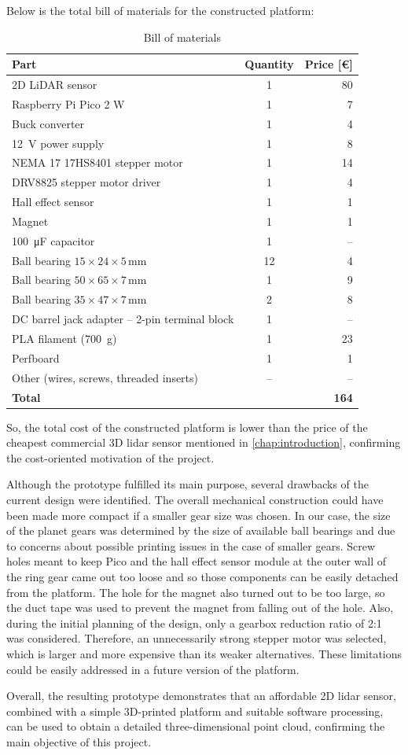 Below is the total bill of materials for the constructed platform:
\begin{table}[H]
    \centering
    \caption{Bill of materials}
    \begin{tabular}{lcr}
        \toprule
        Part & Quantity & Price [\euro] \\
        \midrule
        2D LiDAR sensor & 1 & 80 \\
        Raspberry Pi Pico 2 W & 1 & 7 \\
        Buck converter & 1 & 4 \\
        \SI{12}{V} power supply & 1 & 8 \\
        NEMA 17 17HS8401 stepper motor & 1 & 14 \\
        DRV8825 stepper motor driver & 1 & 4 \\
        Hall effect sensor & 1 & 1 \\
        Magnet & 1 & 1 \\
        \SI{100}{\micro\farad} capacitor & 1 & -- \\
        Ball bearing $15 \times 24 \times 5\,\si{\milli\meter}$ & 12 & 4 \\
        Ball bearing $50 \times 65 \times 7\,\si{\milli\meter}$ & 1 & 9 \\
        Ball bearing $35 \times 47 \times 7\,\si{\milli\meter}$ & 2 & 8 \\
        DC barrel jack adapter -- 2-pin terminal block & 1 & -- \\
        PLA filament (\SI{700}{g}) & 1 & 23 \\
        Perfboard & 1 & 1 \\
        Other (wires, screws, threaded inserts) & -- & -- \\
        \midrule
        \textbf{Total} & & \textbf{164} \\
        \bottomrule
    \end{tabular}
\end{table}

So, the total cost of the constructed platform is lower than the price of the cheapest commercial 3D \gls{lidar} sensor mentioned in \cref{chap:introduction}, confirming the cost-oriented motivation of the project.

Although the prototype fulfilled its main purpose, several drawbacks of the current design were identified.
The overall mechanical construction could have been made more compact if a smaller gear size was chosen. In our case, the size of the planet gears was determined by the size of available ball bearings and due to concerns about possible printing issues in the case of smaller gears.
Screw holes meant to keep Pico and the hall effect sensor module at the outer wall of the ring gear came out too loose and so those components can be easily detached from the platform. The hole for the magnet also turned out to be too large, so the duct tape was used to prevent the magnet from falling out of the hole.
Also, during the initial planning of the design, only a gearbox reduction ratio of 2:1 was considered. Therefore, an unnecessarily strong stepper motor was selected, which is larger and more expensive than its weaker alternatives.
These limitations could be easily addressed in a future version of the platform.

Overall, the resulting prototype demonstrates that an affordable 2D \gls{lidar} sensor, combined with a simple 3D-printed platform and suitable software processing, can be used to obtain a detailed three-dimensional point cloud, confirming the main objective of this project.
